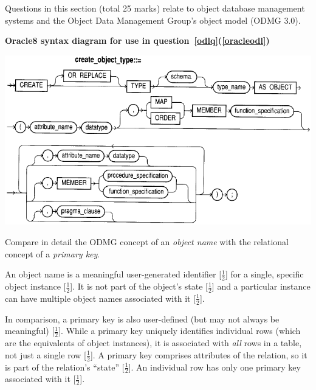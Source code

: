 \documentclass[markingschedule]{ouexam}
\begin{document}
\begin{examsection}{25}{}{Questions in this section (total 25 marks) relate to object
database management systems and the Object Data Management Group's object model
(ODMG 3.0).}
\newpage

\begin{center}
	\textbf{Oracle8 syntax diagram for use in
	question~\ref{odlq}(\ref{oracleodl})}
	
	\bigskip
	\includegraphics{CreateObjectType}
	\bigskip\bigskip
\end{center}


\begin{question}{15}


	\begin{subquestion}{4}
		Compare in detail the ODMG concept of an \emph{object name} with the
		relational concept of a \emph{primary key}.
		\begin{marking}
			An object name is a meaningful user-generated identifier
			[$\frac{1}{2}$] for a single, specific object instance
			[$\frac{1}{2}$]. It is not part of the object's state
			[$\frac{1}{2}$] and a particular instance can have multiple object
			names associated with it [$\frac{1}{2}$].

			In comparison, a primary key is also user-defined (but may not
			always be meaningful) [$\frac{1}{2}$]. While a primary key uniquely
			identifies individual rows (which are the equivalents of object
			instances), it is associated with \emph{all} rows in a table, not
			just a single row [$\frac{1}{2}$]. A primary key comprises
			attributes of the relation, so it is part of the relation's
			``state'' [$\frac{1}{2}$]. An individual row has only one primary
			key associated with it [$\frac{1}{2}$].
		\end{marking}
	\end{subquestion}
	

\end{question}
\end{examsection}
\end{document}
